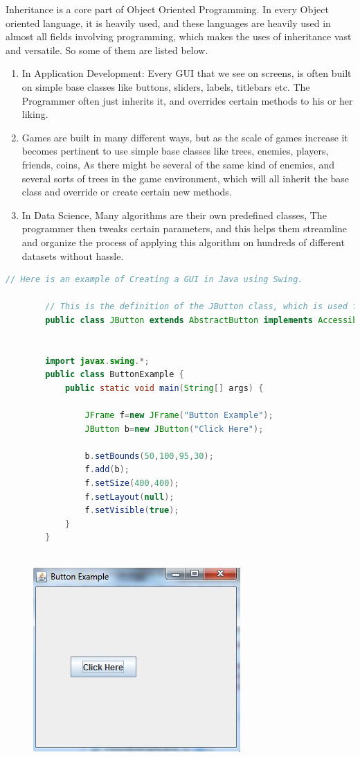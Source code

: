 \documentclass[11pt]{article}
\begin{document}
\begin{enumerate}
	Inheritance is a core part of Object Oriented Programming. In every Object oriented language, it is heavily used, and these languages are heavily used in almost all fields involving programming, which makes the uses of inheritance vast and versatile. So some of them are listed below. 
	\begin{enumerate}
		\item In Application Development: Every GUI that we see on screens, is often built on simple base classes like buttons, sliders, labels, titlebars etc. The Programmer often just inherits it, and overrides certain methods to his or her liking. 
		\item Games are built in many different ways, but as the scale of games increase it becomes pertinent to use simple base classes like trees, enemies, players, friends, coins, As there might be several of the same kind of enemies, and several sorts of trees in the game environment, which will all inherit the base class and override or create certain new methods. 
		\item In Data Science, Many algorithms are their own predefined classes, The programmer then tweaks certain parameters, and this helps them streamline and organize the process of applying this algorithm on hundreds of different datasets without hassle. 
	\end{enumerate}

	\begin{lstlisting}[language = Java]
		// Here is an example of Creating a GUI in Java using Swing. 

		// This is the definition of the JButton class, which is used for placing buttons on the screen. 
		public class JButton extends AbstractButton implements Accessible  


		import javax.swing.*;    
		public class ButtonExample {  
			public static void main(String[] args) {  

				JFrame f=new JFrame("Button Example");  
				JButton b=new JButton("Click Here");

				b.setBounds(50,100,95,30);  
				f.add(b);  
				f.setSize(400,400);  
				f.setLayout(null);  
				f.setVisible(true);   
			}  
		}  
		
	\end{lstlisting}
	
	\begin{figure}[H]
		\centering
		\includegraphics[scale=1]{button.png}
	\end{figure}
	

\end{enumerate}
\end{document}
